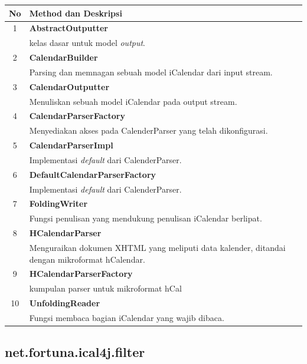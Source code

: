 	\begin{tabular}{|c|p{12cm}|}
		\hline
		\textbf{No} & \textbf{Method dan Deskripsi} \\ \hline \hline
		1 & \textbf{AbstractOutputter}\\
			&	kelas dasar untuk model \textit{output}.\\ \hline
		2 & \textbf{CalendarBuilder}\\
			&	Parsing dan memnagan sebuah model iCalendar dari input stream.\\ \hline
		3 & \textbf{CalendarOutputter}\\
			&	Menuliskan sebuah model iCalendar pada output stream.\\ \hline
		4 & \textbf{CalendarParserFactory}\\
			&	Menyediakan akses pada CalenderParser yang telah dikonfigurasi.\\ \hline
		5 & \textbf{CalendarParserImpl}\\
			&	Implementasi \textit{default} dari CalenderParser.\\ \hline
		6 & \textbf{DefaultCalendarParserFactory	
}\\
			&	Implementasi \textit{default} dari CalenderParser.\\ \hline
		7 & \textbf{FoldingWriter}\\
			&	Fungsi penulisan yang mendukung penulisan iCalendar berlipat.\\ \hline
		8 & \textbf{HCalendarParser}\\
			&	Menguraikan dokumen XHTML yang meliputi data kalender, ditandai dengan mikroformat hCalendar.\\ \hline
		9 & \textbf{HCalendarParserFactory}\\
			&	kumpulan parser untuk mikroformat hCal\\ \hline
		10 & \textbf{UnfoldingReader}\\
			&	Fungsi membaca bagian iCalendar yang wajib dibaca.\\ \hline
	\end{tabular}
	
\subsection{net.fortuna.ical4j.filter}

